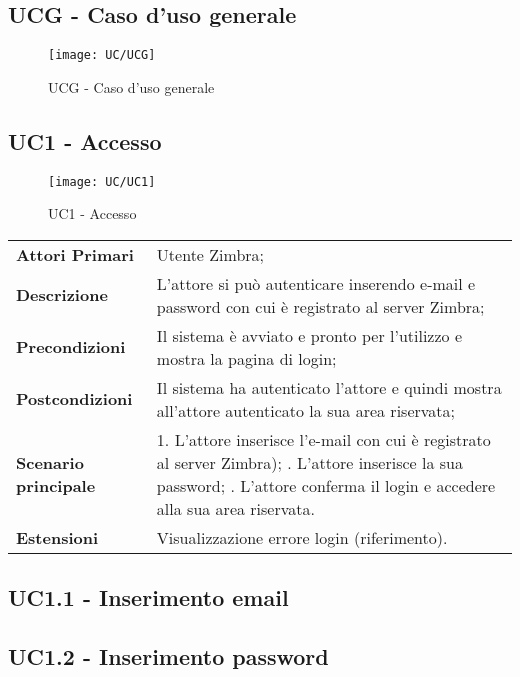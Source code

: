 \subsection{UCG - Caso d'uso generale}
\begin{figure}[H] 
	\centering
	\texttt{[image: UC/UCG]}
	\caption{UCG - Caso d'uso generale}
\end{figure}

\subsection{UC1 - Accesso}
\begin{figure}[H] 
	\centering
	\texttt{[image: UC/UC1]}
	\caption{UC1 - Accesso}
\end{figure}
\begin{center}
	\bgroup
	\def\arraystretch{1.8}     
	\begin{longtable}{  p{4cm} | p{9.5cm} } 
		\textbf{Attori Primari} & Utente Zimbra; \\ 
		\textbf{Descrizione} & L’attore si può autenticare inserendo e-mail e password con cui è registrato al server Zimbra; \\ 
		\textbf{Precondizioni}  & Il sistema è avviato e pronto per l’utilizzo e mostra la pagina di login; \\
		\textbf{Postcondizioni} & Il sistema ha autenticato l’attore e quindi mostra all’attore autenticato la sua area riservata;  \\ 
		\textbf{Scenario principale} & 
			1. L’attore inserisce l'e-mail con cui è registrato al server Zimbra); \newline
			2. L’attore inserisce la sua password; \newline
			3. L’attore conferma il login e accedere alla sua area riservata.\\
		\textbf{Estensioni} & Visualizzazione errore login (riferimento).
	\end{longtable}
	\egroup
\end{center}


\subsection{UC1.1 - Inserimento email}
\subsection{UC1.2 - Inserimento password}

